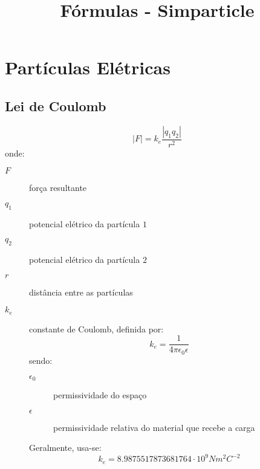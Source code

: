 \documentclass[a4paper,10pt]{article}
\title{Fórmulas - Simparticle}
\author{}
\begin{document}
\maketitle

\section{Partículas Elétricas}

	\subsection{Lei de Coulomb}
		
		\[
			\left|F\right| = k_e \frac{\left|q_1 q_2\right|}{r^2}
		\]
		onde:
		\begin{description}
		 \item [$F$] força resultante
		 \item [$q_1$] potencial elétrico da partícula $1$
		 \item [$q_2$] potencial elétrico da partícula $2$
		 \item [$r$] distância entre as partículas
		 \item [$k_e$] constante de Coulomb, definida por:
			\[
			 k_e = \frac{1}{4 \pi \epsilon_0 \epsilon}
			\]
			sendo:
			\begin{description}
			 \item [$\epsilon_0$] permissividade do espaço
			 \item [$\epsilon$] permissividade relativa do material que recebe a carga
			\end{description}
			Geralmente, usa-se:
			\[
			 k_e = 8.987 551 787 368 176 4 \cdot 10^9N m^2 C^{-2}
			\]


		\end{description}
		
		
\end{document}
